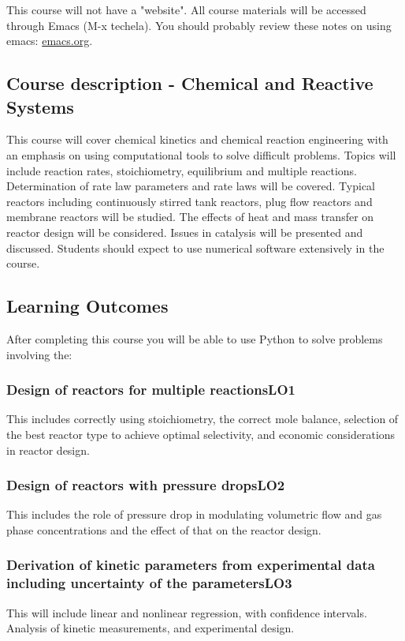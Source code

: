 \documentclass[11pt]{article}
\begin{document}
This course will not have a "website". All course materials will be accessed through Emacs (M-x techela). You should probably review these notes on using emacs: \url{emacs.org}.

\subsection{Course description - Chemical and Reactive Systems}
\label{sec:orgheadline1}

This course will cover chemical kinetics and chemical reaction engineering with an emphasis on using computational tools to solve difficult problems. Topics will include reaction rates, stoichiometry, equilibrium and multiple reactions. Determination of rate law parameters and rate laws will be covered. Typical reactors including continuously stirred tank reactors, plug flow reactors and membrane reactors will be studied. The effects of heat and mass transfer on reactor design will be considered. Issues in catalysis will be presented and discussed. Students should expect to use numerical software extensively in the course.

\subsection{Learning Outcomes}
\label{sec:orgheadline8}

After completing this course you will be able to use Python to solve problems involving the:

\subsubsection{Design of reactors for multiple reactions\hfill{}\textsc{LO1}}
\label{sec:orgheadline2}
This includes correctly using stoichiometry, the correct mole balance, selection of the best reactor type to achieve optimal selectivity, and economic considerations in reactor design.

\subsubsection{Design of reactors with pressure drops\hfill{}\textsc{LO2}}
\label{sec:orgheadline3}
This includes the role of pressure drop in modulating volumetric flow and gas phase concentrations and the effect of that on the reactor design.

\subsubsection{Derivation of kinetic parameters from experimental data including uncertainty of the parameters\hfill{}\textsc{LO3}}
\label{sec:orgheadline4}
This will include linear and nonlinear regression, with confidence intervals. Analysis of kinetic measurements, and experimental design.
\end{document}
